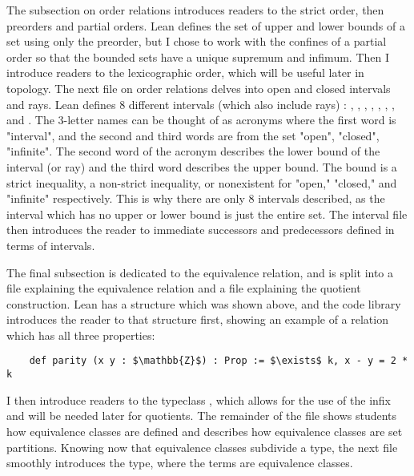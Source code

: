 The subsection on order relations introduces readers to the strict order, then preorders
and partial orders. Lean defines the set of upper and lower bounds of a set using only 
the preorder, but I chose to work with the confines of a partial order so that the 
bounded sets have a unique supremum and infimum. Then I introduce readers to the lexicographic
order, which will be useful later in topology. The next file on order relations delves into 
open and closed intervals and rays. Lean defines 8 different intervals (which also include rays) : 
, , , , , , , and .
The 3-letter names can be thought of as acronyms where the first word is "interval", and the 
second and third words are from the set {"open", "closed", "infinite"}. The second word of the 
acronym describes the lower bound of the interval (or ray) and the third word describes the 
upper bound. The bound is a strict inequality, a non-strict inequality, or nonexistent for
"open," "closed," and "infinite" respectively. This is why there are only 8 intervals described, 
as the interval which has no upper or lower bound is just the entire set. The interval file then
introduces the reader to immediate successors and predecessors defined in terms of intervals.

The final subsection is dedicated to the equivalence relation, and is split into a file 
explaining the equivalence relation and a file explaining the quotient construction.
Lean has a structure  which was shown above, and the code library
introduces the reader to that structure first, showing an example of a relation
which has all three properties: 
\begin{lstlisting}
    def parity (x y : $\mathbb{Z}$) : Prop := $\exists$ k, x - y = 2 * k
\end{lstlisting}
I then introduce readers to the typeclass , which allows for the
use of the infix \lean{$\approx$} and will be needed later for quotients. The 
remainder of the file shows students how equivalence classes are defined and 
describes how equivalence classes are set partitions. Knowing now that equivalence
classes subdivide a type, the next file smoothly introduces the  type, 
where the terms are equivalence classes.

